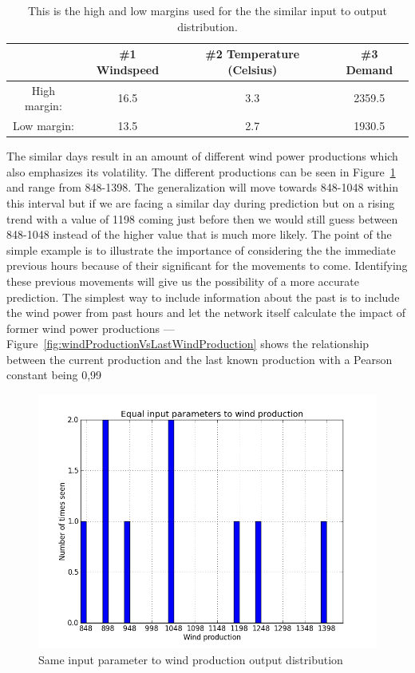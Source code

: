 \begin{table}[ht!]
\centering  %
\begin{tabular}{|c|c|c|c|} %
\hline
 & \#1 Windspeed & \#2 Temperature (Celsius) & \#3 Demand \\ \hline %
High margin: & 16.5 & 3.3 & 2359.5  \\ \hline
Low margin: & 13.5 & 2.7 & 1930.5 \\ \hline %
\hline %
\end{tabular}
\caption{This is the high and low margins used for the the similar input to output distribution.} %
\label{table:similarHoursLimitsWindProd} %
\end{table}

\noindent The similar days result in an amount of different wind power productions which also emphasizes its volatility. The different productions can be seen in Figure~\ref{fig:inputParameterDistribution} and range from 848-1398. The generalization will move towards 848-1048 within this interval but if we are facing a similar day during prediction but on a rising trend with a value of 1198 coming just before then we would still guess between 848-1048 instead of the higher value that is much more likely. The point of the simple example is to illustrate the importance of considering the the immediate previous hours because of their significant for the movements to come. Identifying these previous movements will give us the possibility of a more accurate prediction. The simplest way to include information about the past is to include the wind power from past hours and let the network itself calculate the impact of former wind power productions --- Figure~\ref{fig:windProductionVsLastWindProduction} shows the relationship between the current production and the last known production with a Pearson constant being 0,99   

\begin{figure}[ht!]
\centering
\includegraphics[width=0.85\linewidth]{billeder/Equal_wind.png}
\caption{Same input parameter to wind production output distribution}
\label{fig:inputParameterDistribution}
\end{figure}

